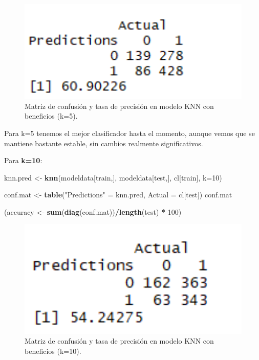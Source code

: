 \documentclass[spanish,]{article}
\newenvironment{Shaded}{\begin{snugshade}}{\end{snugshade}}
\newcommand{\KeywordTok}[1]{\textcolor[rgb]{0.13,0.29,0.53}{\textbf{#1}}}
\newcommand{\DataTypeTok}[1]{\textcolor[rgb]{0.13,0.29,0.53}{#1}}
\newcommand{\DecValTok}[1]{\textcolor[rgb]{0.00,0.00,0.81}{#1}}
\newcommand{\StringTok}[1]{\textcolor[rgb]{0.31,0.60,0.02}{#1}}
\newcommand{\OperatorTok}[1]{\textcolor[rgb]{0.81,0.36,0.00}{\textbf{#1}}}
\newcommand{\NormalTok}[1]{#1}
\begin{document}
\begin{figure}[h]
    \centering
    \includegraphics[width=1\textwidth]{figuras/KNN/benefits_k5.png}
    \caption{Matriz de confusión y tasa de precisión en modelo KNN con beneficios (k=5).}
    \label{fig:KNN:benefitsK5}
\end{figure}

Para k=5 tenemos el mejor clasificador hasta el momento, aunque vemos
que se mantiene bastante estable, sin cambios realmente significativos.

Para \textbf{k=10}:

\begin{Shaded}
\begin{Highlighting}[]
\NormalTok{knn.pred <-}\StringTok{ }\KeywordTok{knn}\NormalTok{(modeldata[train,], modeldata[test,], cl[train], }\DataTypeTok{k=}\DecValTok{10}\NormalTok{) }

\NormalTok{conf.mat <-}\StringTok{ }\KeywordTok{table}\NormalTok{(}\StringTok{"Predictions"}\NormalTok{ =}\StringTok{ }\NormalTok{knn.pred, }\DataTypeTok{Actual =}\NormalTok{ cl[test])}
\NormalTok{conf.mat}

\NormalTok{(accuracy <-}\StringTok{ }\KeywordTok{sum}\NormalTok{(}\KeywordTok{diag}\NormalTok{(conf.mat))}\OperatorTok{/}\KeywordTok{length}\NormalTok{(test) }\OperatorTok{*}\StringTok{ }\DecValTok{100}\NormalTok{)}
\end{Highlighting}
\end{Shaded}

\begin{figure}[h]
    \centering
    \includegraphics[width=1\textwidth]{figuras/KNN/benefits_k10.png}
    \caption{Matriz de confusión y tasa de precisión en modelo KNN con beneficios (k=10).}
    \label{fig:KNN:benefitsK10}
\end{figure}
\end{document}

